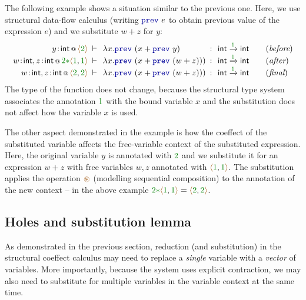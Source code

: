 The following example shows a situation similar to the previous one. Here, we use
structural data-flow calculus (writing $\kvd{prev}~e$ to obtain previous value of the 
expression $e$) and we substitute $w+z$ for $y$:
%
\begin{equation*}
\begin{array}{rclcll}
 \coctx{y\!:\!\ident{int}}{ \alift{\cclrd{2}} } 
  &\narrow{\vdash}& \lambda x.\kvd{prev}~(x + \kvd{prev}~y) &\narrow{:}&
   \ident{int} \xrightarrow{\cclrd{ 1 }} \ident{int} & \quad(\textit{before}) \\
\coctx{w\!:\!\ident{int}, z\!:\!\ident{int}}{\cclrd{2}\cclrd{\ast}\alift{\cclrd{1},\cclrd{1}}} 
  &\narrow{\vdash}& \lambda x.\kvd{prev}~(x + \kvd{prev}~(w+z))) &\narrow{:}&
   \ident{int} \xrightarrow{\cclrd{ 1 }} \ident{int} & \quad(\textit{after}) \\
\coctx{w\!:\!\ident{int}, z\!:\!\ident{int}}{\alift{\cclrd{2},\cclrd{2}}} 
  &\narrow{\vdash}& \lambda x.\kvd{prev}~(x + \kvd{prev}~(w+z))) &\narrow{:}&
   \ident{int} \xrightarrow{\cclrd{ 1 }} \ident{int} & \quad(\textit{final})
\end{array}  
\end{equation*}
%
The type of the function does not change, because the structural type system associates
the annotation $\cclrd{1}$ with the bound variable $x$ and the substitution does not 
affect how the variable $x$ is used.

The other aspect demonstrated in the example is how the coeffect of the substituted 
variable affects the free-variable context of the substituted expression. Here, the
original variable $y$ is annotated with $\cclrd{2}$ and we substitute it for an
expression $w+z$ with free variables $w,z$ annotated with $\alift{\cclrd{1}, \cclrd{1}}$.
The substitution applies the operation $\aseq$ (modelling sequential composition) to 
the annotation of the new context -- in the above example
$\cclrd{2}\cclrd{\ast}\alift{\cclrd{1}, \cclrd{1}}=\alift{\cclrd{2}, \cclrd{2}}$.

\subsection{Holes and substitution lemma}

As demonstrated in the previous section, reduction (and substitution) in the structural coeffect 
calculus may need to replace a \emph{single} variable with a \emph{vector} of variables. 
More importantly, because the system uses explicit contraction, we may also need to substitute 
for multiple variables in the variable context at the same time.

